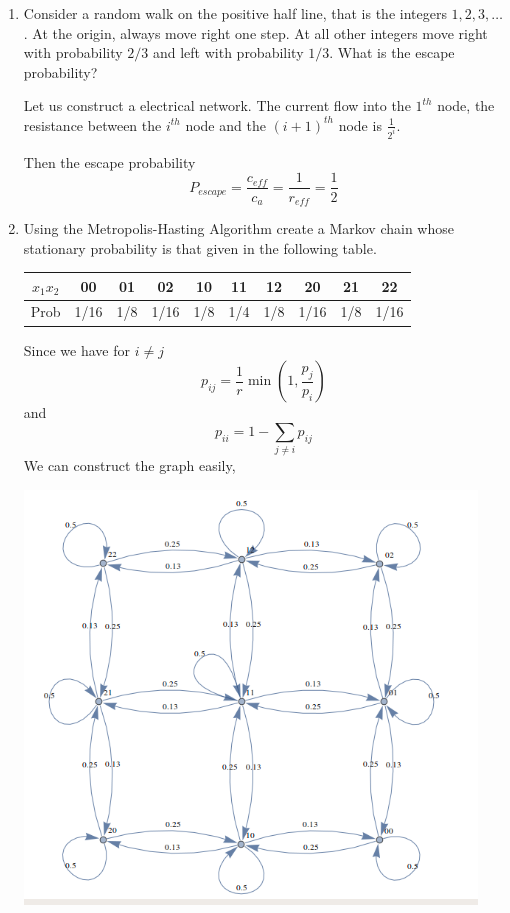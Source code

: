 \documentclass[a4paper, 12pt]{mcshw}
\begin{document}
\begin{enumerate}
    \item Consider a random walk on the positive half line, that is the integers $1, 2, 3, \dots$. At the origin, always move right one step. At all other integers move right with probability $2/3$ and left with probability $1/3$. What is the escape probability?
        \begin{solution}
            Let us construct a electrical network. The current flow into the $1^{th}$ node, the resistance between the $i^{th}$ node and the $(i + 1)^{th}$ node is $\frac{1}{2^i}$. 
            
            Then the escape probability
            $$P_{escape} = \frac{c_{eff}}{c_a} = \frac{1}{r_{eff}} = \frac{1}{2}$$
        \end{solution}
        
    \item Using the Metropolis-Hasting Algorithm create a Markov chain whose stationary probability is that given in the following table.
        \begin{center}
            \begin{tabular}{|c|c|c|c|c|c|c|c|c|c|}
                \hline
                $x_1x_2$ & 00 & 01 & 02 & 10 & 11 & 12 & 20 & 21 & 22\\
                \hline
                Prob & 1/16 & 1/8 & 1/16 & 1/8 & 1/4 & 1/8 & 1/16 & 1/8 & 1/16\\
                \hline
            \end{tabular}
        \end{center}
        \begin{solution}
            Since we have for $i \neq j$
            $$p_{ij} = \frac{1}{r}\min(1, \frac{p_j}{p_i})$$
            and
            $$p_{ii} = 1 - \sum_{j \neq i}p_{ij}$$
            We can construct the graph easily, 
            \begin{center}
                \includegraphics[height=11cm]{1.png}
            \end{center}
        \end{solution}
\end{enumerate}
\end{document}
